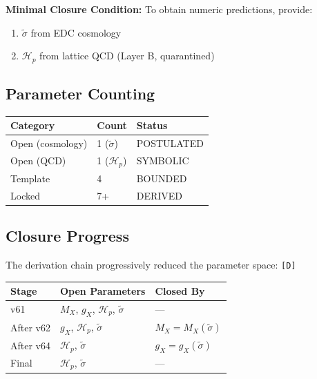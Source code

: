 \documentclass[11pt,a4paper]{article}
\newcommand{\tagD}{\textcolor{green!50!black}{\texttt{[D]}}}
\theoremstyle{definition}
\begin{document}
\begin{opensurfacebox}
\textbf{Minimal Closure Condition:}
To obtain numeric predictions, provide:
\begin{enumerate}
  \item $\tilde{\sigma}$ from EDC cosmology
  \item $\mathcal{H}_p$ from lattice QCD (Layer B, quarantined)
\end{enumerate}
\end{opensurfacebox}

\subsection{Parameter Counting}
\label{subsec:param-counting}

\begin{center}
\begin{tabular}{lll}
\toprule
Category & Count & Status \\
\midrule
Open (cosmology) & 1 ($\tilde{\sigma}$) & POSTULATED \\
Open (QCD) & 1 ($\mathcal{H}_p$) & SYMBOLIC \\
Template & 4 & BOUNDED \\
Locked & 7+ & DERIVED \\
\bottomrule
\end{tabular}
\end{center}

\subsection{Closure Progress}
\label{subsec:closure-progress}

The derivation chain progressively reduced the parameter space: \tagD{}
\begin{center}
\begin{tabular}{lll}
\toprule
Stage & Open Parameters & Closed By \\
\midrule
v61 & $M_X$, $g_X$, $\mathcal{H}_p$, $\tilde{\sigma}$ & --- \\
After v62 & $g_X$, $\mathcal{H}_p$, $\tilde{\sigma}$ & $M_X = M_X(\tilde{\sigma})$ \\
After v64 & $\mathcal{H}_p$, $\tilde{\sigma}$ & $g_X = g_X(\tilde{\sigma})$ \\
Final & $\mathcal{H}_p$, $\tilde{\sigma}$ & --- \\
\bottomrule
\end{tabular}
\end{center}

\end{document}

